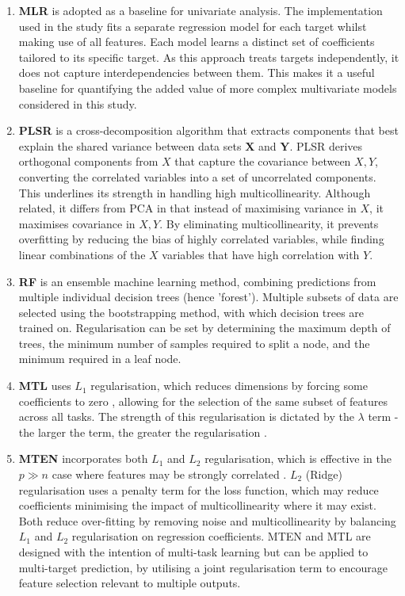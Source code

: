 \documentclass[conference]{IEEEtran}
\begin{document}
\begin{enumerate}
    \item \textbf{MLR} is adopted as a baseline for univariate analysis. The implementation used in the study fits a separate regression model for each target whilst making use of all features. Each model learns a distinct set of coefficients tailored to its specific target. As this approach treats targets independently, it does not capture interdependencies between them. This makes it a useful baseline for quantifying the added value of more complex multivariate models considered in this study.
    \item \textbf{PLSR} is a cross-decomposition algorithm that extracts components that best explain the shared variance between data sets $\textbf{X}$ and $\textbf{Y}$. PLSR derives orthogonal components from $X$ that capture the covariance between $X,Y$, converting the correlated variables into a set of uncorrelated components. This underlines its strength in handling high multicollinearity. Although related, it differs from PCA in that instead of maximising variance in $X$, it maximises covariance in $X,Y$. By eliminating multicollinearity, it prevents overfitting by reducing the bias of highly correlated variables, while finding linear combinations of the $X$ variables that have high correlation with $Y$.
    \item \textbf{RF} is an ensemble machine learning method, combining predictions from multiple individual decision trees (hence 'forest'). Multiple subsets of data are selected using the bootstrapping method, with which decision trees are trained on. Regularisation can be set by determining the maximum depth of trees, the minimum number of samples required to split a node, and the minimum required in a leaf node.
    \item \textbf{MTL} uses $L_1$ regularisation, which reduces dimensions by forcing some coefficients to zero \cite{Zou2005}, allowing for the selection of the same subset of features across all tasks. The strength of this regularisation is dictated by the $\lambda$ term - the larger the term, the greater the regularisation \cite{Abukmeil2022}.  
    \item \textbf{MTEN} incorporates both $L_1$ and $L_2$ regularisation, which is effective in the $p\gg n$ case where features may be strongly correlated \cite{Zou2005}. $L_2$ (Ridge) regularisation uses a penalty term for the loss function, which may reduce coefficients minimising the impact of multicollinearity where it may exist. Both reduce over-fitting by removing noise and multicollinearity by balancing $L_1$ and $L_2$ regularisation on regression coefficients. MTEN and MTL are designed with the intention of multi-task learning but can be applied to multi-target prediction, by utilising a joint regularisation term to encourage feature selection relevant to multiple outputs.
\end{enumerate}
\end{document}
